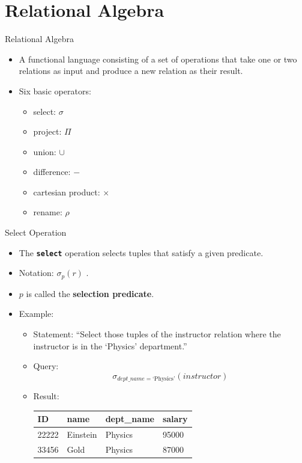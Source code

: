 \documentclass[aspectratio=169]{beamer}
\begin{document}
\section{Relational Algebra}

\begin{frame}{Relational Algebra}
    \begin{itemize}
        \item A functional language consisting of a set of operations that take one or two relations as input and produce a new relation as their result.
        \item Six basic operators:
        \begin{itemize}
            \item select: $\sigma$
            \item project: $\Pi$
            \item union: $\cup$
            \item difference: $-$
            \item cartesian product: $\times$
            \item rename: $\rho$
        \end{itemize}
    \end{itemize}
\end{frame}

\begin{frame}{Select Operation}
    \begin{itemize}
        \item The \textbf{\texttt{select}} operation selects tuples that satisfy a given predicate.
        \item Notation: { \LARGE $\sigma_p (r)$ }.
        \item $p$ is called the \textbf{selection predicate}.
        \item Example: 
        \begin{itemize}
            \item Statement: ``Select those tuples of the instructor relation where the instructor is in the `Physics' department.''
            \item Query: 
                {\large
                $$
                    \sigma_{dept\_name = \text{`Physics'}} (instructor)
                $$}
            \item Result:\\
                \vspace{2mm}
                \centering
                \begin{tabular}{| l | l | l | l |}
                \hline
                 ID & name & dept\_name & salary \\
                 \hline
                 22222 & Einstein & Physics & 95000 \\
                 \hline
                 33456 & Gold & Physics & 87000 \\
                 \hline
                \end{tabular}
        \end{itemize}
    \end{itemize}
\end{frame}
\end{document}
